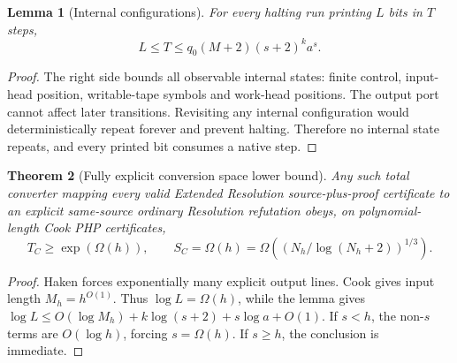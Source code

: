 \documentclass[11pt]{article}
\newtheorem{theorem}{Theorem}
\newtheorem{lemma}[theorem]{Lemma}
\begin{document}
\begin{lemma}[Internal configurations]
For every halting run printing $L$ bits in $T$ steps,
\[
L\le T\le q_0(M+2)(s+2)^ka^s.
\]
\end{lemma}
\begin{proof}
The right side bounds all observable internal states: finite control, input-head position, writable-tape symbols and work-head positions. The output port cannot affect later transitions. Revisiting any internal configuration would deterministically repeat forever and prevent halting. Therefore no internal state repeats, and every printed bit consumes a native step.
\end{proof}
\begin{theorem}[Fully explicit conversion space lower bound]
Any such total converter mapping every valid Extended Resolution source-plus-proof certificate to an \emph{explicit same-source ordinary Resolution} refutation obeys, on polynomial-length Cook PHP certificates,
\[
T_C\ge\exp(\Omega(h)),\qquad
S_C=\Omega(h)=\Omega((N_h/\log(N_h+2))^{1/3}).
\]
\end{theorem}
\begin{proof}
Haken forces exponentially many explicit output lines. Cook gives input length $M_h=h^{O(1)}$. Thus $\log L=\Omega(h)$, while the lemma gives $\log L\le O(\log M_h)+k\log(s+2)+s\log a+O(1)$. If $s<h$, the non-$s$ terms are $O(\log h)$, forcing $s=\Omega(h)$. If $s\ge h$, the conclusion is immediate.
\end{proof}
\end{document}
